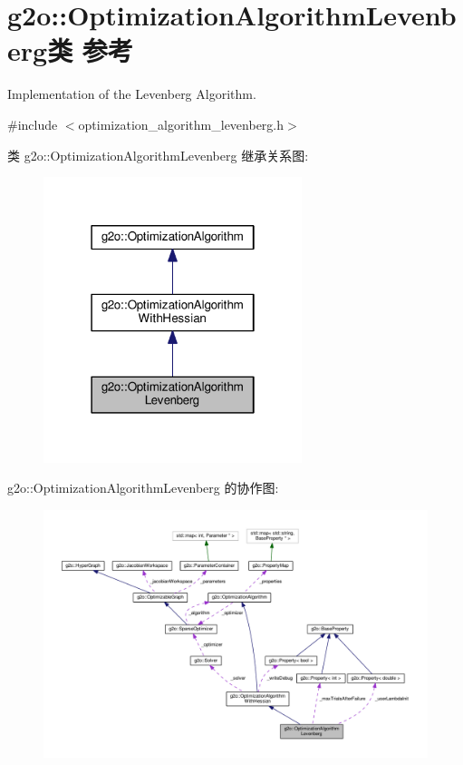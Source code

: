 \hypertarget{classg2o_1_1OptimizationAlgorithmLevenberg}{\section{g2o\-:\-:Optimization\-Algorithm\-Levenberg类 参考}
\label{classg2o_1_1OptimizationAlgorithmLevenberg}
}


Implementation of the Levenberg Algorithm.  




{\ttfamily \#include $<$optimization\-\_\-algorithm\-\_\-levenberg.\-h$>$}



类 g2o\-:\-:Optimization\-Algorithm\-Levenberg 继承关系图\-:
\nopagebreak
\begin{figure}[H]
\begin{center}
\leavevmode
\includegraphics[width=214pt]{classg2o_1_1OptimizationAlgorithmLevenberg__inherit__graph}
\end{center}
\end{figure}


g2o\-:\-:Optimization\-Algorithm\-Levenberg 的协作图\-:
\nopagebreak
\begin{figure}[H]
\begin{center}
\leavevmode
\includegraphics[width=350pt]{classg2o_1_1OptimizationAlgorithmLevenberg__coll__graph}
\end{center}
\end{figure}
